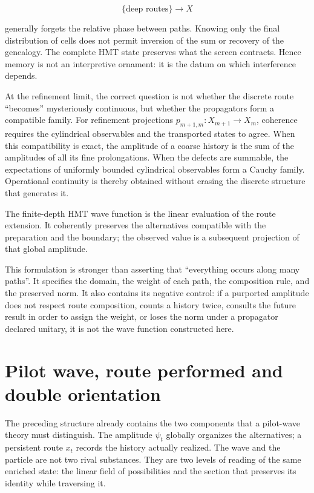 \[
  \{\text{deep routes}\}\longrightarrow X
\]

generally forgets the relative phase between paths. Knowing only the
final distribution of cells does not permit inversion of the sum or recovery of the
genealogy. The complete HMT state preserves what the screen contracts. Hence
memory is not an interpretive ornament: it is the datum on which interference depends.

At the refinement limit, the correct question is not whether the discrete route ``becomes'' mysteriously continuous, but whether the propagators form a compatible family. For refinement projections \(p_{m+1,m}:X_{m+1}\to X_m\), coherence requires the cylindrical observables and the transported states to agree. When this compatibility is exact, the amplitude of a coarse history is the sum of the amplitudes of all its fine prolongations. When the defects are summable, the expectations of uniformly bounded cylindrical observables form a Cauchy family. Operational continuity is thereby obtained without erasing the discrete structure that generates it.

\begin{principle}
The finite-depth HMT wave function is the linear evaluation of the route
extension. It coherently preserves the alternatives compatible with the
preparation and the boundary; the observed value is a subsequent projection
of that global amplitude.
\end{principle}

This formulation is stronger than asserting that ``everything occurs along many paths''.
It specifies the domain, the weight of each path, the composition rule, and the
preserved norm. It also contains its negative control: if a purported amplitude does not
respect route composition, counts a history twice, consults the
future result in order to assign the weight, or loses the norm under a propagator
declared unitary, it is not the wave function constructed here.

\section{Pilot wave, route performed and double orientation}

The preceding structure already contains the two components that a pilot-wave theory
must distinguish. The amplitude \(\psi_t\) globally organizes the alternatives;
a persistent route \(x_t\) records the history actually realized. The wave
and the particle are not two rival substances. They are two levels of reading of the same
enriched state: the linear field of possibilities and the section that preserves its
identity while traversing it.

